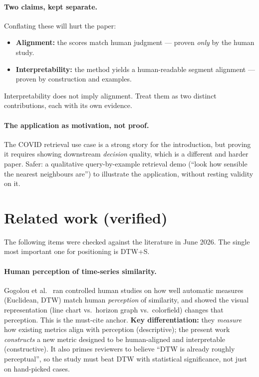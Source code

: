 \documentclass[11pt]{article}
\begin{document}
\paragraph{Two claims, kept separate.} Conflating these will hurt the paper:
\begin{itemize}[leftmargin=*]
  \item \textbf{Alignment:} the scores match human judgment --- proven \emph{only} by the
  human study.
  \item \textbf{Interpretability:} the method yields a human-readable segment alignment ---
  proven by construction and examples.
\end{itemize}
Interpretability does not imply alignment. Treat them as two distinct contributions, each
with its own evidence.

\paragraph{The application as motivation, not proof.} The COVID retrieval use case is a
strong story for the introduction, but proving it requires showing downstream
\emph{decision} quality, which is a different and harder paper. Safer: a qualitative
query-by-example retrieval demo (``look how sensible the nearest neighbours are'') to
illustrate the application, without resting validity on it.

\section{Related work (verified)}
The following items were checked against the literature in June 2026. The single most
important one for positioning is DTW+S.

\paragraph{Human perception of time-series similarity.}
Gogolou et al.~\cite{gogolou2019} ran controlled human studies on how well automatic
measures (Euclidean, DTW) match human \emph{perception} of similarity, and showed the
visual representation (line chart vs.\ horizon graph vs.\ colorfield) changes that
perception. This is the must-cite anchor. \textbf{Key differentiation:} they
\emph{measure} how existing metrics align with perception (descriptive); the present work
\emph{constructs} a new metric designed to be human-aligned and interpretable
(constructive). It also primes reviewers to believe ``DTW is already roughly perceptual'',
so the study must beat DTW with statistical significance, not just on hand-picked cases.
\end{document}
